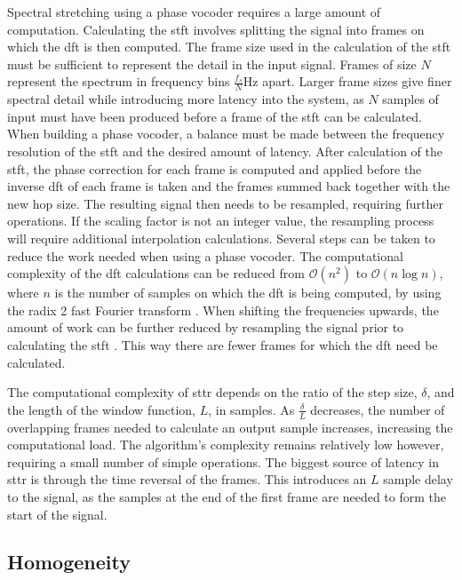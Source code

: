 		Spectral stretching using a phase vocoder requires a large amount of computation. Calculating the
		\acrshort{stft} involves splitting the signal into frames on which the \acrshort{dft} is then computed. The
		frame size used in the calculation of the \acrshort{stft} must be sufficient to represent the detail in the
		input signal. Frames of size $N$ represent the spectrum in frequency bins $\frac{f_{s}}{N}$Hz apart. Larger
		frame sizes give finer spectral detail while introducing more latency into the system, as $N$ samples of
		input must have been produced before a frame of the \acrshort{stft} can be calculated. When building a
		phase vocoder, a balance must be made between the frequency resolution of the \acrshort{stft} and the
		desired amount of latency. After calculation of the \acrshort{stft}, the phase correction for each frame is
		computed and applied before the inverse \acrshort{dft} of each frame is taken and the frames summed back
		together with the new hop size. The resulting signal then needs to be resampled, requiring further
		operations. If the scaling factor is not an integer value, the resampling process will require additional
		interpolation calculations. Several steps can be taken to reduce the work needed when using a phase
		vocoder. The computational complexity of the \acrshort{dft} calculations can be reduced from $\mathcal{O}
		\left( n^{2} \right)$ to $\mathcal{O}(n\log{n})$, where $n$ is the number of samples on which the
		\acrshort{dft} is being computed, by using the radix 2 fast Fourier transform
		\citep{portnoff1976implementation}.  When shifting the frequencies upwards, the amount of work can be
		further reduced by resampling the signal prior to calculating the \acrshort{stft} \citep{laroche1999new}.
		This way there are fewer frames for which the \acrshort{dft} need be calculated.

		The computational complexity of \acrshort{sttr} depends on the ratio of the step size, $\delta$, and the
		length of the window function, $L$, in samples. As $\frac{\delta}{L}$ decreases, the number of overlapping
		frames needed to calculate an output sample increases, increasing the computational load. The algorithm's
		complexity remains relatively low however, requiring a small number of simple operations. The biggest
		source of latency in \acrshort{sttr} is through the time reversal of the frames. This introduces an $L$
		sample delay to the signal, as the samples at the end of the first frame are needed to form the start of
		the signal.

	\subsection{Homogeneity}
	\label{sec:ExcitationEvaluation-Comparison-Homogeneity}
